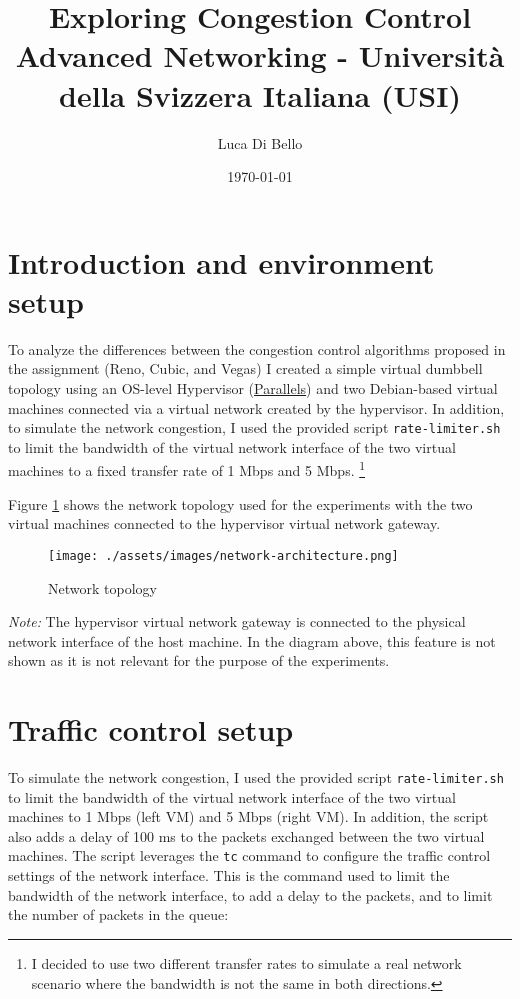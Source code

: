 \documentclass[a4paper, 11pt]{article}
\title{Exploring Congestion Control\\[1ex] \large Advanced Networking - Università della Svizzera Italiana (USI)}
\author{Luca Di Bello}
\date{\today}
\begin{document}
\maketitle
\tableofcontents

\pagebreak

\section{Introduction and environment setup}
\label{sec:introduction}

To analyze the differences between the congestion control algorithms proposed in the assignment (Reno, Cubic, and Vegas) I created a simple virtual dumbbell topology using an OS-level Hypervisor (\href{https://www.parallels.com/}{Parallels}) and two Debian-based virtual machines connected via a virtual network created by the hypervisor. In addition, to simulate the network congestion, I used the provided script \texttt{rate-limiter.sh} to limit the bandwidth of the virtual network interface of the two virtual machines to a fixed transfer rate of 1 Mbps and 5 Mbps. \footnote{I decided to use two different transfer rates to simulate a real network scenario where the bandwidth is not the same in both directions.}

Figure \ref{fig:topology} shows the network topology used for the experiments with the two virtual machines connected to the hypervisor virtual network gateway.

\begin{figure}[h]
	\centering
	\texttt{[image: ./assets/images/network-architecture.png]}
	\caption{Network topology}
	\label{fig:topology}
\end{figure}

\textit{Note:} The hypervisor virtual network gateway is connected to the physical network interface of the host machine. In the diagram above, this feature is not shown as it is not relevant for the purpose of the experiments.

\section{Traffic control setup}

To simulate the network congestion, I used the provided script \texttt{rate-limiter.sh} to limit the bandwidth of the virtual network interface of the two virtual machines to 1 Mbps (left VM) and 5 Mbps (right VM). In addition, the script also adds a delay of 100 ms to the packets exchanged between the two virtual machines. The script leverages the \texttt{tc} command to configure the traffic control settings of the network interface. This is the command used to limit the bandwidth of the network interface, to add a delay to the packets, and to limit the number of packets in the queue:
\end{document}
